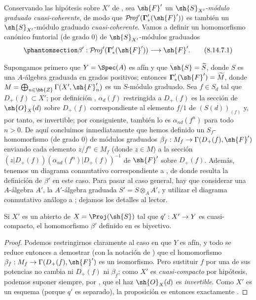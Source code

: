 \documentclass[oneside,10pt]{amsart}
\makeatletter
\newcommand{\ega@arrow}[2]{\mathchoice{#1}{#2}{#2}{#2}}
\renewcommand{\to}{\ega@arrow{\longrightarrow}{\rightarrow}}
\def\shProj{\mathcal{P}\!\mathit{roj}}
\newcommand{\oldpage}[2][]{\marginnote{\normalfont\footnotesize\textbf{#1}~|~#2}\ignorespaces}
\let\EGAOriginalLabel\label
\renewcommand{\label}[1]{\phantomsection\EGAOriginalLabel{#1}}
\makeatother
\begin{document}
\begin{env}[8.14.7]
\label{II.8.14.7}
Conservando las hipótesis sobre $X'$ de , sea $\sh{F}'$ un \emph{$\sh{S}_{X'}$-módulo graduado cuasi-coherente}, de modo que $\shProj'(\boldsymbol{\Gamma}'_*(\sh{F}'))$ es también un $\sh{S}_{X'}$-módulo graduado \emph{cuasi-coherente}.
\oldpage[II]{200}
Vamos a definir un homomorfismo canónico funtorial (de grado $0$) de $\sh{S}_{X'}$-módulos graduados
\[
\label{II.8.14.7.1}
    \beta': \shProj'(\boldsymbol{\Gamma}'_*(\sh{F}')) \to \sh{F}'.
\tag{8.14.7.1}
\]

Supongamos primero que $Y=\Spec(A)$ es afín y que $\sh{S}=\widetilde{S}$, donde $S$ es una $A$-álgebra graduada en grados positivos;
entonces $\boldsymbol{\Gamma}'_*(\sh{F}')=\widetilde{M}$, donde $M=\bigoplus_{n\in\bb{Z}}\Gamma(X',\sh{F}'_n)$ es un $S$-módulo graduado.
Sea $f\in S_d$ tal que $D_+(f)\subset X'$;
por definición , $\alpha_d(f)$ restringida a $D_+(f)$ es la sección de $\sh{O}_X(d)$ sobre $D_+(f)$ correspondiente al elemento $f/1$ de $(S(d))_{(f)}$ y, por tanto, es invertible;
por consiguiente, también lo es $\alpha_{nd}(f^n)$ para todo $n>0$.
De aquí concluimos inmediatamente que hemos definido un $S_f$-homomorfismo (de grado $0$) de módulos graduados $\beta_f:M_f\to\Gamma(D_+(f),\sh{F}')$ enviando cada elemento $z/f^n\in M_f$ (donde $z\in M$) a la sección $(z|D_+(f))(\alpha_{nd}(f^n)|D_+(f))^{-1}$ de $\sh{F}'$ sobre $D_+(f)$.
Además, tenemos un diagrama conmutativo correspondiente a , de donde resulta la definición de $\beta'$ en este caso.
Para pasar al caso general, hay que considerar una $A$-álgebra $A'$, la $A'$-álgebra graduada $S'=S\otimes_A A'$, y utilizar el diagrama conmutativo análogo a ;
dejamos los detalles al lector.
\end{env}

\begin{proposition}[8.14.8]
\label{II.8.14.8}
Si $X'$ es un abierto de $X=\Proj(\sh{S})$ tal que $q':X'\to Y$ es cuasi-compacto, el homomorfismo $\beta'$ definido en  es biyectivo.
\end{proposition}

\begin{proof}
Podemos restringirnos claramente al caso en que $Y$ es afín, y todo se reduce entonces a demostrar (con la notación de ) que el homomorfismo $\beta_f:M_f\to\Gamma(D_+(f),\sh{F}')$ es un isomorfismo.
Pero sustituir $f$ por una de sus potencias no cambia ni $D_+(f)$ ni $\beta_f$;
como $X'$ es \emph{cuasi-compacto} por hipótesis, podemos suponer siempre, por , que el haz $\sh{O}_X(d)$ es \emph{invertible}.
Como $X'$ es un esquema (porque $q'$ es separado), la proposición es entonces exactamente .
\end{proof}
\end{document}
